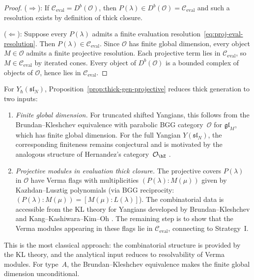 \begin{proof}
($\Rightarrow$):
If $\mathcal{C}_{\mathrm{eval}} = D^b(\mathcal{O})$, then
$P(\lambda) \in D^b(\mathcal{O}) = \mathcal{C}_{\mathrm{eval}}$
and such a resolution exists by definition of thick closure.

($\Leftarrow$):
Suppose every $P(\lambda)$ admits a finite evaluation
resolution~\eqref{eq:proj-eval-resolution}.  Then
$P(\lambda) \in \mathcal{C}_{\mathrm{eval}}$.  Since $\mathcal{O}$
has finite global dimension, every object $M \in \mathcal{O}$ admits
a finite projective resolution.  Each projective term lies in
$\mathcal{C}_{\mathrm{eval}}$, so $M \in
\mathcal{C}_{\mathrm{eval}}$ by iterated cones.  Every object of
$D^b(\mathcal{O})$ is a bounded complex of objects of
$\mathcal{O}$, hence lies in $\mathcal{C}_{\mathrm{eval}}$.
\end{proof}

\begin{remark}
\label{rem:kl-input-yangian}
For $Y_\hbar(\mathfrak{sl}_N)$,
Proposition~\ref{prop:thick-gen-projective} reduces thick generation
to two inputs:
\begin{enumerate}[label=\textup{(\alph*)}]
\item \emph{Finite global dimension.}
  For truncated shifted Yangians, this follows from the
  Brundan--Kleshchev equivalence \cite{BrunKlesh06} with parabolic
  BGG category~$\mathcal{O}$ for $\mathfrak{gl}_M$, which has
  finite global dimension.  For the full Yangian
  $Y(\mathfrak{sl}_N)$, the corresponding finiteness remains
  conjectural and is motivated by the analogous structure of Hernandez's
  category~$\mathcal{O}_\bZ$ \cite{Hernandez05}.
\item \emph{Projective modules in evaluation thick closure.}
  The projective covers $P(\lambda)$ in $\mathcal{O}$ have Verma
  flags with multiplicities $(P(\lambda) : M(\mu))$ given by
  Kazhdan--Lusztig polynomials (via BGG reciprocity:
  $(P(\lambda) : M(\mu)) = [M(\mu) : L(\lambda)]$).
  The combinatorial data is accessible from the KL theory for
  Yangians developed by Brundan--Kleshchev \cite{BrunKlesh06} and
  Kang--Kashiwara--Kim--Oh \cite{KKKO18}.  The remaining step is
  to show that the Verma modules appearing in these flags lie in
  $\mathcal{C}_{\mathrm{eval}}$, connecting to Strategy~I\@.
\end{enumerate}
This is the most classical approach: the combinatorial structure is
provided by the KL theory, and the analytical input reduces to
resolvability of Verma modules.  For type~$A$, the
Brundan--Kleshchev equivalence makes the finite global dimension
unconditional.
\end{remark}

